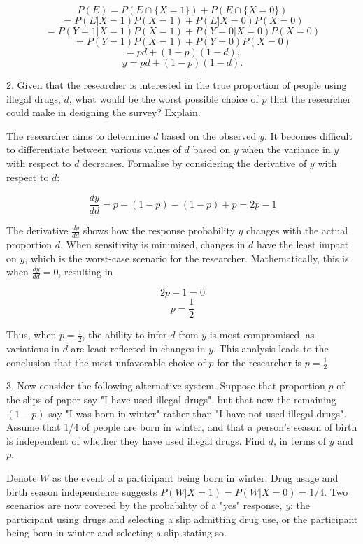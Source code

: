 \documentclass[12pt]{article}
\begin{document}
\[ P(E) = P(E \cap \{X = 1\}) + P(E \cap \{X = 0\}) \]
\[ = P(E | X = 1)P(X = 1) + P(E | X = 0)P(X = 0) \]
\[ = P(Y = 1 | X = 1)P(X = 1) + P(Y = 0 | X = 0)P(X = 0) \]
\[ = P(Y = 1)P(X = 1) + P(Y = 0)P(X = 0) \]
\[ = pd + (1 - p)(1 - d), \]
\[ y = pd + (1 - p)(1 - d). \]

\begin{q}
2. Given that the researcher is interested in the true proportion of people using illegal drugs, \(d\), what would be the worst possible choice of \(p\) that the researcher could make in designing the survey? Explain.
\end{q}

The researcher aims to determine \( d \) based on the observed \( y \). It becomes difficult to differentiate between various values of \( d \) based on \( y \) when the variance in \( y \) with respect to \( d \) decreases. Formalise by considering the derivative of \( y \) with respect to \( d \):

\[ \frac{dy}{dd} = p - (1 - p) - (1 - p) + p = 2p - 1 \]

The derivative \( \frac{dy}{dd} \) shows how the response probability \( y \) changes with the actual proportion \( d \). When sensitivity is minimised, changes in \( d \) have the least impact on \( y \), which is the worst-case scenario for the researcher. Mathematically, this is when \( \frac{dy}{dd} = 0 \), resulting in

\[ 2p - 1 = 0 \]
\[ p = \frac{1}{2} \]

Thus, when \( p = \frac{1}{2} \), the ability to infer \( d \) from \( y \) is most compromised, as variations in \( d \) are least reflected in changes in \( y \). This analysis leads to the conclusion that the most unfavorable choice of \( p \) for the researcher is \( p = \frac{1}{2} \).

\begin{q}
3. Now consider the following alternative system. Suppose that proportion \(p\) of the slips of paper say "I have used illegal drugs", but that now the remaining \((1-p)\) say "I was born in winter" rather than "I have not used illegal drugs". Assume that 1/4 of people are born in winter, and that a person's season of birth is independent of whether they have used illegal drugs. Find \(d\), in terms of \(y\) and \(p\).
\end{q}

Denote \(W\) as the event of a participant being born in winter. Drug usage and birth season independence suggests \(P(W|X=1) = P(W|X=0) = 1/4\). Two scenarios are now covered by the probability of a "yes" response, \(y\): the participant using drugs and selecting a slip admitting drug use, or the participant being born in winter and selecting a slip stating so.
\end{document}
